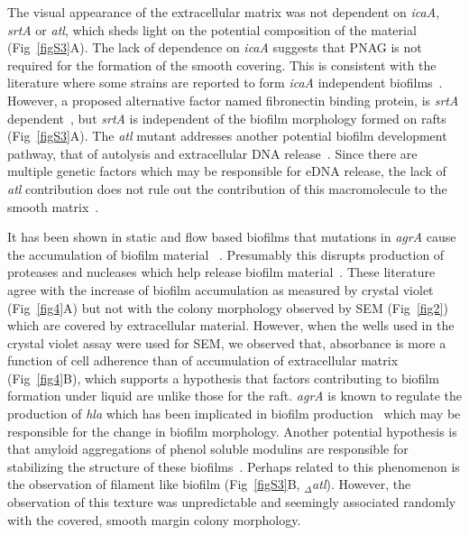 \documentclass[10pt,letterpaper]{article}
\begin{document}
The visual appearance of the extracellular matrix was not dependent on \textit{icaA}, \textit{srtA} or \textit{atl}, which sheds light on the potential composition of the material (Fig~\ref{figS3}A).
The lack of dependence on \textit{icaA} suggests that PNAG is not required for the formation of the smooth covering.
This is consistent with the literature where some strains are reported to form \textit{icaA} independent biofilms~\cite{fitzpatrick_evidence_2005}.
However, a proposed alternative factor named fibronectin binding protein, is \textit{srtA} dependent~\cite{oneill_novel_2008}, but \textit{srtA} is independent of the biofilm morphology formed on rafts (Fig~\ref{figS3}A).
The \textit{atl} mutant addresses another potential biofilm development pathway, that of autolysis and extracellular DNA release~\cite{bose_contribution_2012}.
Since there are multiple genetic factors which may be responsible for eDNA release, the lack of \textit{atl} contribution does not rule out the contribution of this macromolecule to the smooth matrix~\cite{ranjit_staphylococcus_2011}.

It has been shown in static and flow based biofilms that mutations in \textit{agrA} cause the accumulation of biofilm material ~\cite{periasamy_how_2012}.
Presumably this disrupts production of proteases and nucleases which help release biofilm material~\cite{boles_agr-mediated_2008, kiedrowski_nuclease_2011}.
These literature agree with the increase of biofilm accumulation as measured by crystal violet (Fig~\ref{fig4}A) but not with the colony morphology observed by SEM (Fig~\ref{fig2}) which are covered by extracellular material.
However, when the wells used in the crystal violet assay were used for SEM, we observed that, absorbance is more a function of cell adherence than of accumulation of extracellular matrix (Fig~\ref{fig4}B), which supports a hypothesis that factors contributing to biofilm formation under liquid are unlike those for the raft.
\textit{agrA} is known to regulate the production of \textit{hla} which has been implicated in biofilm production~\cite{caiazza_alpha-toxin_2003} which may be responsible for the change in biofilm morphology.
Another potential hypothesis is that amyloid aggregations of phenol soluble modulins are responsible for stabilizing the structure of these biofilms~\cite{schwartz_functional_2012}.
Perhaps related to this phenomenon is the observation of filament like biofilm (Fig~\ref{figS3}B, $_\Delta$\textit{atl}).
However, the observation of this texture was unpredictable and seemingly associated randomly with the covered, smooth margin colony morphology.
\end{document}
